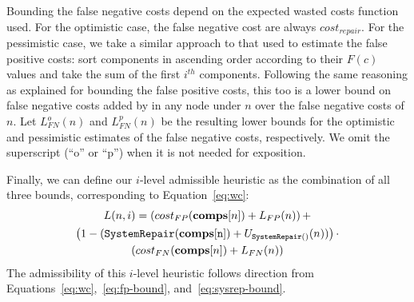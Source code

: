 \documentclass[review]{elsarticle}
\newcommand\sysrep[1]{{\tt SystemRepair(#1)}}
\newcommand{\brpswc}{\textit{BRP$_S(wc)$}}
\newcommand{\comps}{\textbf{comps}}
\begin{document}
Bounding the false negative costs depend on the expected wasted costs function used. 
For the optimistic case, the false negative cost are always $cost_{repair}$. 
For the pessimistic case, we take a similar approach to that used to estimate the false positive costs: sort components in ascending order according to their $F(c)$ values and take the sum of the first $i^{th}$ components. Following the same reasoning as explained for bounding the false positive costs, this too is a lower bound on false negative costs added by in any node under $n$ over the false negative costs of $n$. 
Let $L^o_{FN}(n)$ and $L^p_{FN}(n)$ be the resulting lower bounds for the optimistic and pessimistic estimates of the false negative costs, respectively. We omit the superscript (``o'' or ``p'') when it is not needed for exposition. 


Finally, we can define our $i$-level admissible heuristic as the combination of all three bounds, corresponding to Equation~\ref{eq:wc}:
\begin{multline}
    L(n,i)=\left(cost_{FP}(\comps[n])+ L_{FP}(n)\right)+\\
    \left(1-(\sysrep{\comps[n]}+ U_{\sysrep{}}(n))\right)\cdot \\
    \left(cost_{FN}(\comps[n])+ L_{FN}(n)\right)
    \label{eq:i-level}
\end{multline}
The admissibility of this $i$-level heuristic follows direction from 
Equations~\ref{eq:wc},~\ref{eq:fp-bound}, and~\ref{eq:sysrep-bound}. 
    




\end{document}
